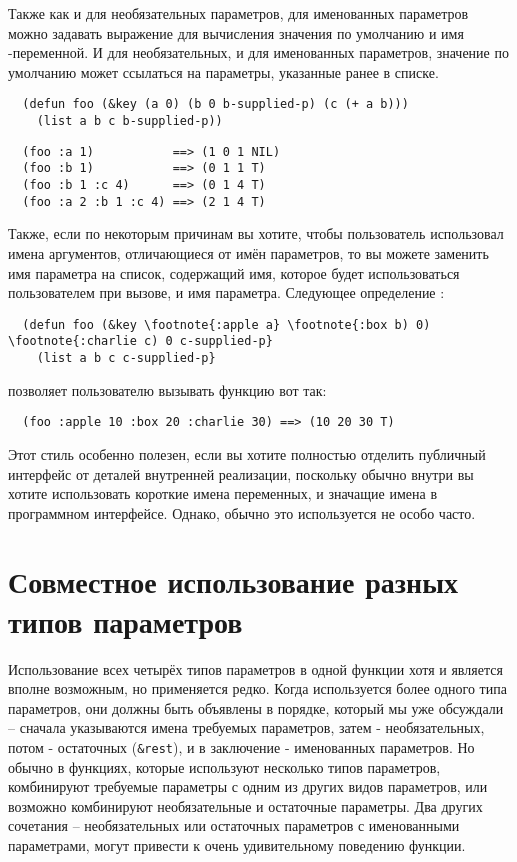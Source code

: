 Также как и для необязательных параметров, для именованных параметров можно задавать
выражение для вычисления значения по умолчанию и имя -переменной.  И для
необязательных, и для именованных параметров, значение по умолчанию может ссылаться на
параметры, указанные ранее в списке.

\begin{lstlisting}
  (defun foo (&key (a 0) (b 0 b-supplied-p) (c (+ a b)))
    (list a b c b-supplied-p))
\end{lstlisting}
  
\begin{verbatim}
  (foo :a 1)           ==> (1 0 1 NIL)
  (foo :b 1)           ==> (0 1 1 T)
  (foo :b 1 :c 4)      ==> (0 1 4 T)
  (foo :a 2 :b 1 :c 4) ==> (2 1 4 T)
\end{verbatim}

Также, если по некоторым причинам вы хотите, чтобы пользователь использовал имена
аргументов, отличающиеся от имён параметров, то вы можете заменить имя параметра на
список, содержащий имя, которое будет использоваться пользователем при вызове, и имя
параметра.  Следующее определение :

\begin{lstlisting}
  (defun foo (&key \footnote{:apple a} \footnote{:box b) 0) \footnote{:charlie c) 0 c-supplied-p}
    (list a b c c-supplied-p}
\end{lstlisting}

позволяет пользователю вызывать функцию вот так:

\begin{verbatim}
  (foo :apple 10 :box 20 :charlie 30) ==> (10 20 30 T)
\end{verbatim}

Этот стиль особенно полезен, если вы хотите полностью отделить публичный интерфейс от
деталей внутренней реализации, поскольку обычно внутри вы хотите использовать короткие
имена переменных, и значащие имена в программном интерфейсе.  Однако, обычно это
используется не особо часто.

\section{Совместное использование разных типов параметров}

Использование всех четырёх типов параметров в одной функции хотя и является вполне
возможным, но применяется редко.  Когда используется более одного типа параметров, они
должны быть объявлены в порядке, который мы уже обсуждали -- сначала указываются имена
требуемых параметров, затем - необязательных, потом - остаточных (\lstinline!&rest!), и в
заключение - именованных параметров.  Но обычно в функциях, которые используют несколько
типов параметров, комбинируют требуемые параметры с одним из других видов параметров, или
возможно комбинируют необязательные и остаточные параметры.  Два других сочетания --
необязательных или остаточных параметров с именованными параметрами, могут привести к
очень удивительному поведению функции.

